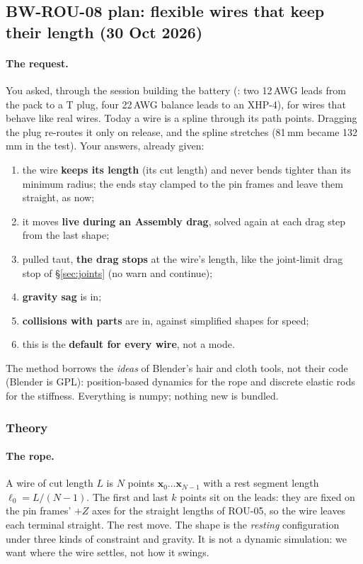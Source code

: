 \subsection{BW-ROU-08 plan: flexible wires that keep their length (30 Oct 2026)}\label{sec:rou-flex-plan}

\paragraph{The request.} You asked, through the session building the battery (: two
12\,AWG leads from the pack to a T plug, four 22\,AWG balance leads to an XHP-4), for wires that behave like
real wires. Today a wire is a spline through its path points. Dragging the plug re-routes it only on release,
and the spline stretches (81\,mm became 132\,mm in the test). Your answers, already given:
\begin{enumerate}[nosep]
  \item the wire \textbf{keeps its length} (its cut length) and never bends tighter than its minimum radius;
        the ends stay clamped to the pin frames and leave them straight, as now;
  \item it moves \textbf{live during an Assembly drag}, solved again at each drag step from the last shape;
  \item pulled taut, \textbf{the drag stops} at the wire's length, like the joint-limit drag stop of
        \S\ref{sec:joints} (no warn and continue);
  \item \textbf{gravity sag} is in;
  \item \textbf{collisions with parts} are in, against simplified shapes for speed;
  \item this is the \textbf{default for every wire}, not a mode.
\end{enumerate}
The method borrows the \emph{ideas} of Blender's hair and cloth tools, not their code (Blender is GPL): position-based
dynamics for the rope and discrete elastic rods for the stiffness. Everything is numpy; nothing new is bundled.

\subsubsection*{Theory}

\paragraph{The rope.} A wire of cut length $L$ is $N$ points $\mathbf x_0\dots\mathbf x_{N-1}$ with a rest
segment length $\ell_0=L/(N-1)$. The first and last $k$ points sit on the leads: they are fixed on the pin
frames' $+Z$ axes for the straight lengths of ROU-05, so the wire leaves each terminal straight. The rest move.
The shape is the \emph{resting} configuration under three kinds of constraint and gravity. It is not a dynamic
simulation: we want where the wire settles, not how it swings.

